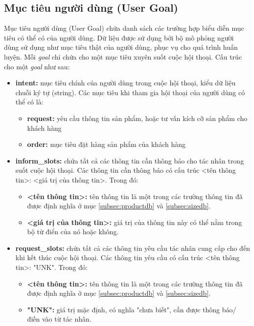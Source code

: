 \subsection{Mục tiêu người dùng (User Goal)}
\label{subsec:usergoal}
Mục tiêu người dùng (User Goal) chứa danh sách các trường hợp biểu diễn mục tiêu có thể có của người dùng. Dữ liệu được sử dụng bởi bộ mô phỏng người dùng sử dụng như mục tiêu thật của người dùng, phục vụ cho quá trình huấn luyện. Mỗi \textit{goal} chỉ chứa cho một mục tiêu xuyên suốt cuộc hội thoại. Cấu trúc cho một \textit{goal} như sau:

\begin{itemize}
    \item \textbf{intent:} mục tiêu chính của người dùng trong cuộc hội thoại, kiểu dữ liệu chuỗi ký tự (string). Các mục tiêu khi tham gia hội thoại của người dùng có thể có là:
    \begin{itemize}
        \item \textbf{request:} yêu cầu thông tin sản phẩm, hoặc tư vấn kích cỡ sản phẩm cho khách hàng
        \item \textbf{order:} mục tiêu đặt hàng sản phẩm của khách hàng
    \end{itemize}
    \item \textbf{inform\_slots:} chứa tất cả các thông tin cần thông báo cho tác nhân trong suốt cuộc hội thoại. Các thông tin cần thông báo có cấu trúc <tên thông tin>: <giá trị của thông tin>. Trong đó:
    \begin{itemize}
        \item \textbf{<tên thông tin>:} tên thông tin là một trong các trường thông tin đã được định nghĩa ở mục \ref{subsec:productdb} và \ref{subsec:sizedb}.
        \item \textbf{<giá trị của thông tin>:} giá trị của thông tin này có thể nằm trong bộ từ điển của nó hoặc không.
    \end{itemize}
    \item \textbf{request\_slots:} chứa tất cả các thông tin yêu cầu tác nhân cung cấp cho đến khi kết thúc cuộc hội thoại. Các thông tin yêu cầu có cấu trúc <tên thông tin>: "UNK". Trong đó:
    \begin{itemize}
        \item \textbf{<tên thông tin>:} tên thông tin là một trong các trường thông tin đã được định nghĩa ở mục \ref{subsec:productdb} và \ref{subsec:sizedb}.
        \item \textbf{"UNK":} giá trị mặc định, có nghĩa "chưa biết", cần được thông báo/ điền vào từ tác nhân.
    \end{itemize}
\end{itemize}


